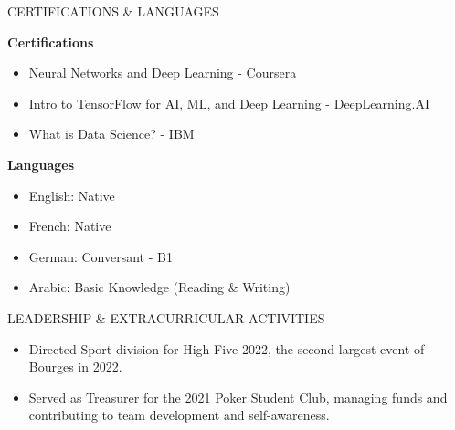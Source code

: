 \documentclass{resume} %
\begin{document}

\begin{rSection}{CERTIFICATIONS \& LANGUAGES} 

{\bf Certifications}
\begin{itemize}
    \item Neural Networks and Deep Learning - Coursera
    \item Intro to TensorFlow for AI, ML, and Deep Learning - DeepLearning.AI
    \item What is Data Science? - IBM
\end{itemize}

{\bf Languages}
\begin{itemize}
    \item English: Native
    \item French: Native
    \item German: Conversant - B1
    \item Arabic: Basic Knowledge (Reading \& Writing)
\end{itemize}

\end{rSection}


\begin{rSection}{LEADERSHIP \& EXTRACURRICULAR ACTIVITIES} 

\begin{itemize}
    \item Directed Sport division for High Five 2022, the second largest event of Bourges in 2022.
    \item Served as Treasurer for the 2021 Poker Student Club, managing funds and contributing to team development and self-awareness.
\end{itemize}

\end{rSection}
\end{document}
